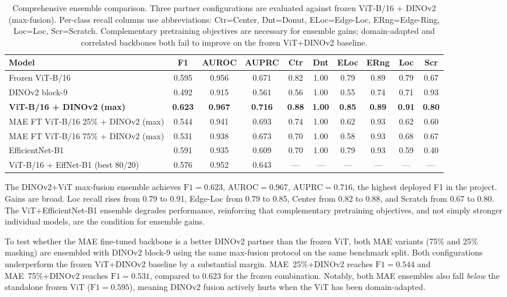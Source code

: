 \documentclass[11pt]{article}
\begin{document}
\begin{table}[H]
\centering
\caption{Comprehensive ensemble comparison. Three partner configurations are evaluated against frozen ViT-B/16 + DINOv2 (max-fusion). Per-class recall columns use abbreviations: Ctr=Center, Dnt=Donut, ELoc=Edge-Loc, ERng=Edge-Ring, Loc=Loc, Scr=Scratch. Complementary pretraining objectives are necessary for ensemble gains; domain-adapted and correlated backbones both fail to improve on the frozen ViT+DINOv2 baseline.}
\label{tab:ensemble_results}
\begin{tabularx}{\linewidth}{>{\raggedright\arraybackslash}Xccccccccc}
\toprule
Model & F1 & AUROC & AUPRC & Ctr & Dnt & ELoc & ERng & Loc & Scr \\
\midrule
Frozen ViT-B/16  & 0.595 & 0.956 & 0.671 & 0.82 & 1.00 & 0.79 & 0.89 & 0.79 & 0.67 \\
DINOv2 block-9   & 0.492 & 0.915 & 0.561 & 0.56 & 1.00 & 0.55 & 0.74 & 0.71 & 0.93 \\
\textbf{ViT-B/16 + DINOv2 (max)} & \textbf{0.623} & \textbf{0.967} & \textbf{0.716} & \textbf{0.88} & \textbf{1.00} & \textbf{0.85} & \textbf{0.89} & \textbf{0.91} & \textbf{0.80} \\
\midrule
MAE FT ViT-B/16 25\% + DINOv2 (max) & 0.544 & 0.941 & 0.693 & 0.74 & 1.00 & 0.62 & 0.93 & 0.62 & 0.60 \\
MAE FT ViT-B/16 75\% + DINOv2 (max) & 0.531 & 0.938 & 0.673 & 0.70 & 1.00 & 0.58 & 0.93 & 0.68 & 0.67 \\
\midrule
EfficientNet-B1  & 0.591 & 0.935 & 0.609 & 0.70 & 1.00 & 0.79 & 0.93 & 0.59 & 0.40 \\
ViT-B/16 + EffNet-B1 (best 80/20) & 0.576 & 0.952 & 0.643 & --- & --- & --- & --- & --- & --- \\
\bottomrule
\end{tabularx}
\end{table}

The DINOv2+ViT max-fusion ensemble achieves $\mathrm{F1}=0.623$, $\mathrm{AUROC}=0.967$, $\mathrm{AUPRC}=0.716$, the highest deployed F1 in the project. Gains are broad. Loc recall rises from 0.79 to 0.91, Edge-Loc from 0.79 to 0.85, Center from 0.82 to 0.88, and Scratch from 0.67 to 0.80. The ViT+EfficientNet-B1 ensemble degrades performance, reinforcing that complementary pretraining objectives, and not simply stronger individual models, are the condition for ensemble gains.

To test whether the MAE fine-tuned backbone is a better DINOv2 partner than the frozen ViT, both MAE variants (75\% and 25\% masking) are ensembled with DINOv2 block-9 using the same max-fusion protocol on the same benchmark split. Both configurations underperform the frozen ViT+DINOv2 baseline by a substantial margin. MAE~25\%+DINOv2 reaches $\mathrm{F1}=0.544$ and MAE~75\%+DINOv2 reaches $\mathrm{F1}=0.531$, compared to $0.623$ for the frozen combination. Notably, both MAE ensembles also fall \emph{below} the standalone frozen ViT ($\mathrm{F1}=0.595$), meaning DINOv2 fusion actively hurts when the ViT has been domain-adapted.
\end{document}
